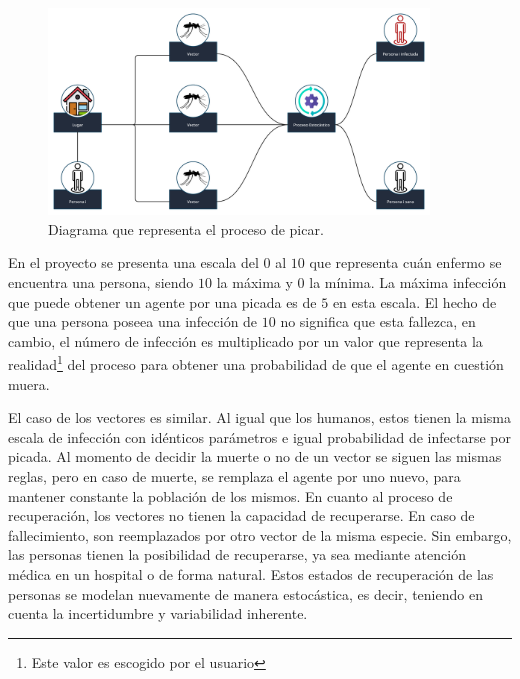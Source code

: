 \begin{figure}[htb]
    \centering
    \includegraphics[width=0.9\textwidth]{Graphics/Grafico_Proceso_Picada.jpg}
    \caption{Diagrama que representa el proceso de picar.}
\end{figure}
En el proyecto se presenta una escala del $0$ al $10$ que representa cuán enfermo se encuentra una persona, siendo
$10$ la máxima y $0$ la mínima. La máxima infección que puede obtener un agente por una picada es de $5$ en esta 
escala. El hecho de que una persona poseea una infección de $10$ no significa que esta fallezca, en cambio,
el número de infección es multiplicado por un valor que representa la realidad\footnote{Este valor es escogido 
por el usuario} del proceso para obtener una probabilidad de que el agente en cuestión muera.


El caso de los vectores es similar. Al igual que los humanos, estos tienen la misma escala de infección con 
idénticos parámetros e igual probabilidad de infectarse por picada. Al momento de decidir la muerte o no
de un vector se siguen las mismas reglas, pero en caso de muerte, se remplaza el agente por uno nuevo, para 
mantener constante la población de los mismos.
En cuanto al proceso de recuperación, los vectores no tienen la capacidad de recuperarse. En caso de 
fallecimiento, son reemplazados por otro vector de la misma especie. Sin embargo, las personas tienen la 
posibilidad de recuperarse, ya sea mediante atención médica en un hospital o de forma natural. Estos estados 
de recuperación de las personas se modelan nuevamente de manera estocástica, es decir, teniendo en cuenta la 
incertidumbre y variabilidad inherente.

